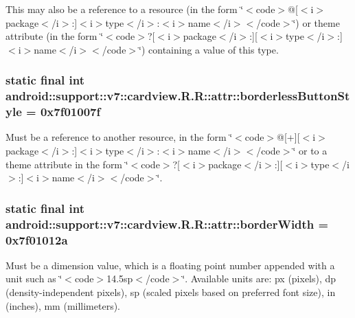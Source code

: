 This may also be a reference to a resource (in the form \char`\"{}$<$code$>$@\mbox{[}$<$i$>$package$<$/i$>$:\mbox{]}$<$i$>$type$<$/i$>$:$<$i$>$name$<$/i$>$$<$/code$>$\char`\"{}) or theme attribute (in the form \char`\"{}$<$code$>$?\mbox{[}$<$i$>$package$<$/i$>$:\mbox{]}\mbox{[}$<$i$>$type$<$/i$>$:\mbox{]}$<$i$>$name$<$/i$>$$<$/code$>$\char`\"{}) containing a value of this type. \hypertarget{classandroid_1_1support_1_1v7_1_1cardview_1_1_r_1_1attr_aee60704d0c3385a2388246cf7945eba}{
\subsubsection[{borderlessButtonStyle}]{\setlength{\rightskip}{0pt plus 5cm}static final int android::support::v7::cardview.R.R::attr::borderlessButtonStyle = 0x7f01007f}}
\label{classandroid_1_1support_1_1v7_1_1cardview_1_1_r_1_1attr_aee60704d0c3385a2388246cf7945eba}


Must be a reference to another resource, in the form \char`\"{}$<$code$>$@\mbox{[}+\mbox{]}\mbox{[}$<$i$>$package$<$/i$>$:\mbox{]}$<$i$>$type$<$/i$>$:$<$i$>$name$<$/i$>$$<$/code$>$\char`\"{} or to a theme attribute in the form \char`\"{}$<$code$>$?\mbox{[}$<$i$>$package$<$/i$>$:\mbox{]}\mbox{[}$<$i$>$type$<$/i$>$:\mbox{]}$<$i$>$name$<$/i$>$$<$/code$>$\char`\"{}. \hypertarget{classandroid_1_1support_1_1v7_1_1cardview_1_1_r_1_1attr_cda7ae6dbd155799e73a16faea777259}{
\subsubsection[{borderWidth}]{\setlength{\rightskip}{0pt plus 5cm}static final int android::support::v7::cardview.R.R::attr::borderWidth = 0x7f01012a}}
\label{classandroid_1_1support_1_1v7_1_1cardview_1_1_r_1_1attr_cda7ae6dbd155799e73a16faea777259}


Must be a dimension value, which is a floating point number appended with a unit such as \char`\"{}$<$code$>$14.5sp$<$/code$>$\char`\"{}. Available units are: px (pixels), dp (density-independent pixels), sp (scaled pixels based on preferred font size), in (inches), mm (millimeters). 

